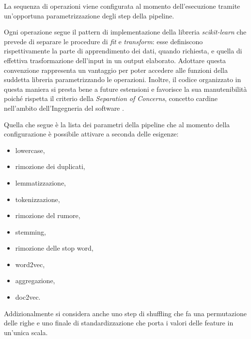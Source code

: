 \documentclass[12pt]{report}
\theoremstyle{definition}
\begin{document}
La sequenza di operazioni viene configurata al momento dell'esecuzione tramite un'opportuna parametrizzazione degli step della pipeline.

Ogni operazione segue il pattern di implementazione della libreria \textit{scikit-learn} che prevede di separare le procedure di \textit{fit} e \textit{transform}: esse definiscono rispettivamente la parte di apprendimento dei dati, quando richiesta, e quella di effettiva trasformazione dell'input in un output elaborato.
Adottare questa convenzione rappresenta un vantaggio per poter accedere alle funzioni della suddetta libreria parametrizzando le operazioni.
Inoltre, il codice organizzato in questa maniera si presta bene a future estensioni e favorisce la sua manutenibilità poiché rispetta il criterio della \textit{Separation of Concerns}, concetto cardine nell'ambito dell'Ingegneria del software \cite{32}.

Quella che segue è la lista dei parametri della pipeline che al momento della configurazione è possibile attivare a seconda delle esigenze:
\begin{itemize}
    \item lowercase,
    \item rimozione dei duplicati,
    \item lemmatizzazione,
    \item tokenizzazione,
    \item rimozione del rumore,
    \item stemming,
    \item rimozione delle stop word,
    \item word2vec,
    \item aggregazione,
    \item doc2vec.
\end{itemize}
Addizionalmente si considera anche uno step di shuffling che fa una permutazione delle righe e uno finale di standardizzazione che porta i valori delle feature in un'unica scala.
\end{document}
